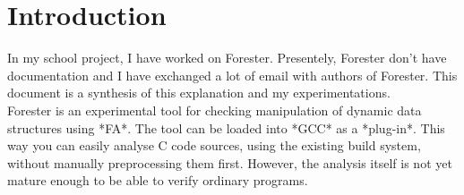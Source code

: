 \section {Introduction}

In my school project, I have worked on Forester. Presentely, Forester don't have documentation and I have exchanged a lot of email with authors of Forester. This document is a synthesis of this explanation and my experimentations.
\\

Forester is an experimental tool for checking manipulation of dynamic data
structures using *\gls{FA}*. The tool can be loaded into *GCC* as a *plug-in*.  This
way you can easily analyse C code sources, using the existing build system,
without manually preprocessing them first. However, the analysis itself is not yet mature enough to be able to verify ordinary programs.